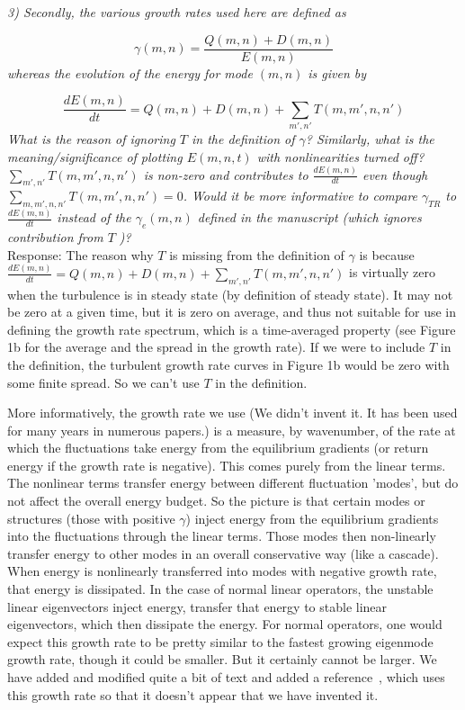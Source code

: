 \documentclass[12pt]{article}
\def\beq{\begin{equation}}
\def\eeq{\end{equation}}
\newcommand{\diff}[2]{\frac{d#1}{d#2}}
\begin{document}
\emph{3) Secondly, the various growth rates used here are defined as}

\beq
\gamma(m,n) = \frac{Q(m,n) + D(m,n)}{E(m,n)} \nonumber
\eeq
\emph{whereas the evolution of the energy for mode $(m, n)$ is given by}

\beq
\diff{E(m,n)}{t} = Q(m,n) + D(m,n) + \sum_{m',n'} T(m,m',n,n') \nonumber
\eeq
\emph{What is the reason of ignoring $T$ in the definition of $\gamma$? Similarly, what is the meaning/significance
of plotting $E(m, n, t)$ with nonlinearities turned off?  $\sum_{m',n'} T(m,m',n,n')$ is non-zero and contributes to 
$\diff{E(m, n)}{t}$ even though $\sum_{m,m',n,n'} T(m,m',n,n') = 0$. Would it be more informative
to compare $\gamma_{TR}$ to $\diff{E(m, n)}{t}$ instead of the $\gamma_e (m, n)$ defined in the manuscript (which ignores
contribution from $T$ )?} \\


Response: The reason why $T$ is missing from the definition of $\gamma$ is because $\diff{E(m,n)}{t} = Q(m,n) + D(m,n) + \sum_{m',n'} T(m,m',n,n')$ is virtually zero when the turbulence is in steady state (by definition of steady state). It may not be zero at a given time, but it is zero on average, and thus not suitable for use in defining the growth rate spectrum, which is a time-averaged property (see Figure 1b for the average and the spread in the growth rate). If we were to include $T$ in the definition, the turbulent growth rate curves in Figure 1b would be zero with some finite spread. So we can't use $T$ in the definition.

More informatively, the growth rate we use (We didn't invent it. It has been used for many years in numerous papers.) is a measure, by wavenumber, of the rate at which the fluctuations take energy from the equilibrium gradients (or return energy if the growth rate is negative). This comes purely from the linear terms. The nonlinear terms transfer energy between different fluctuation 'modes', but do not affect the overall energy budget.
So the picture is that certain modes or structures (those with positive $\gamma$) inject energy from the equilibrium gradients into the fluctuations through the linear terms. Those modes then non-linearly transfer energy to other modes in an overall conservative way (like a cascade). When energy is nonlinearly transferred into modes with negative growth rate, that energy is dissipated. In the case of normal linear operators, the unstable linear eigenvectors inject energy, transfer that energy to stable linear eigenvectors, which then dissipate the energy. For normal operators, one would expect this growth rate to be pretty similar to the fastest growing eigenmode growth rate, though it could be smaller. But it certainly cannot be larger. We have added and modified quite a bit of text and added a reference~\cite{terry2006b}, which uses this growth rate so that it doesn't appear that we have invented it.
\end{document}
